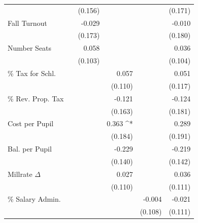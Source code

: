 \begin{scriptsize}
\begin{longtable}{ l D{.}{.}{3}D{.}{.}{3}D{.}{.}{3}D{.}{.}{3}D{.}{.}{3} }
                   &                   & (0.156)           &                   &                   & (0.171)          \\ 
Fall Turnout       &                   & -0.029            &                   &                   & -0.010           \\ 
                   &                   & (0.173)           &                   &                   & (0.180)          \\ 
Number Seats       &                   & 0.058             &                   &                   & 0.036            \\ 
                   &                   & (0.103)           &                   &                   & (0.104)          \\ 
\% Tax for Schl.  &                   &                   & 0.057             &                   & 0.051            \\ 
                   &                   &                   & (0.110)           &                   & (0.117)          \\ 
\% Rev. Prop. Tax &                   &                   & -0.121            &                   & -0.124           \\ 
                   &                   &                   & (0.163)           &                   & (0.181)          \\ 
Cost per Pupil     &                   &                   & 0.363 ^*          &                   & 0.289            \\ 
                   &                   &                   & (0.184)           &                   & (0.191)          \\ 
Bal. per Pupil     &                   &                   & -0.229            &                   & -0.219           \\ 
                   &                   &                   & (0.140)           &                   & (0.142)          \\ 
Millrate $\Delta$ &                   &                   & 0.027             &                   & 0.036            \\ 
                   &                   &                   & (0.110)           &                   & (0.111)          \\ 
\% Salary Admin.  &                   &                   &                   & -0.004            & -0.021           \\ 
                   &                   &                   &                   & (0.108)           & (0.111)          \\ 

\end{longtable}
\end{scriptsize}
